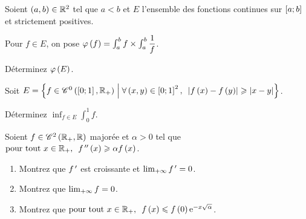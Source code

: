 \begin{exo}
Soient \(\left(a,b\right)\in\mathbb{R}^2\) tel que \(a<b\) et \(E\) l'ensemble des fonctions continues sur \(\left[a;b\right]\) et strictement positives.

Pour \(f\in E\), on pose \(\varphi\left(f\right)=\int_a^bf\times\int_a^b\dfrac{1}{f}\).

Déterminez \(\varphi\left(E\right)\).
\end{exo}

\begin{exo}
Soit \(E=\accol{f\in\ensclasse{0}{\intervii{0}{1}}{\Rp}\tq\quantifs{\forall\paren{x,y}\in\intervii{0}{1}^2}\abs{f\paren{x}-f\paren{y}}\geq\abs{x-y}}\).

Déterminez \(\inf_{f\in E}\int_0^1f\).
\end{exo}

\begin{exo}
Soient \(f\in\mathscr{C}^{2}\left(\mathbb{R}_+,\mathbb{R}\right)\) majorée et \(\alpha>0\) tel que \(\quantifs{\tpt x\in\Rp}f\seconde\paren{x}\geq\alpha f\paren{x}\).

\begin{enumerate}
    \item Montrez que \(f^{\,\prime}\) est croissante et \(\lim_{+\infty}f^{\,\prime}=0\). \\
    \item Montrez que \(\lim_{+\infty}f=0\). \\
    \item Montrez que \(\quantifs{\tpt x\in\Rp}f\paren{x}\leq f\paren{0}\e{-x\sqrt{\alpha}}\).
\end{enumerate}
\end{exo}
